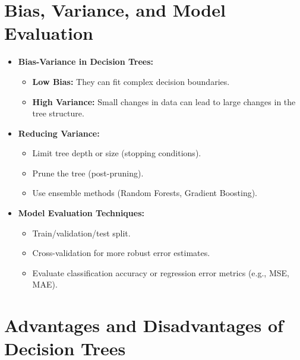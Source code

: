 \documentclass[10pt]{article}
\begin{document}
\section{Bias, Variance, and Model Evaluation}
\begin{itemize}
    \item \textbf{Bias-Variance in Decision Trees:}
    \begin{itemize}
        \item \textbf{Low Bias:} They can fit complex decision boundaries.
        \item \textbf{High Variance:} Small changes in data can lead to large changes in the tree structure.
    \end{itemize}

    \item \textbf{Reducing Variance:}
    \begin{itemize}
        \item Limit tree depth or size (stopping conditions).
        \item Prune the tree (post-pruning).
        \item Use ensemble methods (Random Forests, Gradient Boosting).
    \end{itemize}

    \item \textbf{Model Evaluation Techniques:}
    \begin{itemize}
        \item Train/validation/test split.
        \item Cross-validation for more robust error estimates.
        \item Evaluate classification accuracy or regression error metrics (e.g., MSE, MAE).
    \end{itemize}
\end{itemize}

\section{Advantages and Disadvantages of Decision Trees}
\end{document}
